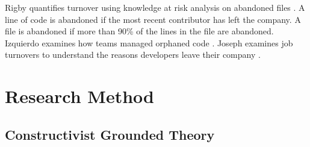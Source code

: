 Rigby quantifies turnover using knowledge at risk analysis on abandoned files  \cite{Rigby2016Turnover}. A line of code is abandoned if the most recent contributor has left the company.  A file is abandoned if more than 90\% of the lines in the file are abandoned.  Izquierdo examines how teams managed orphaned code \cite{Izquierdo2009Turnover}. Joseph examines job turnovers to understand the reasons developers leave their company  \cite{Joseph2007Turnover}.  

\section{Research Method}
\label{SustainableSoftwareDevelopmentResearchMethod}
\subsection{Constructivist Grounded Theory}





